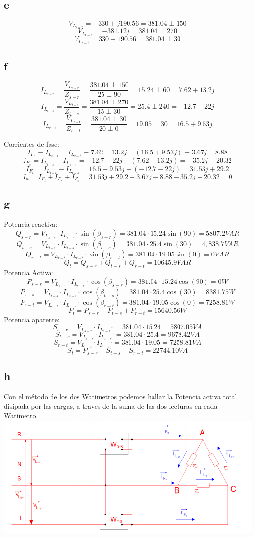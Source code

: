 \documentclass{article}
\begin{document}
\subsection{e}
\[V_L_{s-r}=-330+j190.56=381.04\perp150\]
\[V_L_{t-s}=-381.12j=381.04\perp270\]
\[V_L_{r-t}=330+190.56=381.04\perp30\]
\subsection{f}
\[I_L_{s-r}=\frac{V_L_{s-r}}{Z_{s-r}}=\frac{381.04\perp150}{25\perp90}=15.24\perp60=7.62+13.2j\]
\[I_L_{t-s}=\frac{V_L_{t-s}}{Z_{t-s}}=\frac{381.04\perp270}{15\perp30}=25.4\perp240=-12.7-22j\]
\[I_L_{r-t}=\frac{V_L_{r-t}}{Z_{r-t}}=\frac{381.04\perp30}{20\perp0}=19.05\perp30=16.5+9.53j\]

Corrientes de fase:
\[I_F_r=I_L_{s-r}-I_L_{r-t}=7.62+13.2j-(16.5+9.53j)=3.67j-8.88\]
\[I_F_s=I_L_{t-s}-I_L_{s-r}=-12.7-22j-(7.62+13.2j)=-35.2j-20.32\]
\[I_F_t=I_L_{r-t}-I_L_{t-s}=16.5+9.53j-(-12.7-22j)=31.53j+29.2\]
\[I_n=I_F_t+I_F_r+I_F_s=31.53j+29.2+3.67j-8.88-35.2j-20.32=0\]
\subsection{g}
Potencia reactiva:
\[Q_{s-r}=V_L_{s-r}\cdot I_L_{s-r}\cdot\sin(\beta_{s-r})=381.04\cdot 15.24\sin(90)=5807.2VAR\]
\[Q_{t-s}=V_L_{t-s}\cdot I_L_{t-s}\cdot\sin(\beta_{t-s})=381.04\cdot 25.4\sin(30)=4,838.7VAR\]
\[Q_{r-t}=V_L_{r-t}\cdot I_L_{r-t}\cdot\sin(\beta_{r-t})=381.04\cdot 19.05\sin(0)=0VAR\]
\[Q_t=Q_{s-r}+Q_{t-s}+Q_{r-t}=10645.9VAR\]
Potencia Activa:
\[P_{s-r}=V_L_{s-r}\cdot I_L_{s-r}\cdot\cos(\beta_{s-r})=381.04\cdot 15.24\cos(90)=0W\]
\[P_{t-s}=V_L_{t-s}\cdot I_L_{t-s}\cdot\cos(\beta_{t-s})=381.04\cdot 25.4\cos(30)=8381.75W\]
\[P_{r-t}=V_L_{r-t}\cdot I_L_{r-t}\cdot\cos(\beta_{r-t})=381.04\cdot 19.05\cos(0)=7258.81W\]
\[P_t=P_{s-r}+P_{t-s}+P_{r-t}=15640.56W\]
Potencia aparente:
\[S_{s-r}=V_L_{s-r}\cdot I_L_{s-r}\cdot=381.04\cdot 15.24=5807.05VA\]
\[S_{t-s}=V_L_{t-s}\cdot I_L_{t-s}\cdot=381.04\cdot 25.4=9678.42VA\]
\[S_{r-t}=V_L_{r-t}\cdot I_L_{r-t}\cdot=381.04\cdot 19.05=7258.81VA\]
\[S_t=P_{s-r}+S_{t-s}+S_{r-t}=22744.10VA\]
\subsection{h}
Con el método de los dos Watimetros podemos hallar la Potencia activa total disipada por las cargas, a traves de la suma de las dos lecturas en cada Watimetro.\\
\includegraphics[scale=0.5]{watimetos.png}
\end{document}
